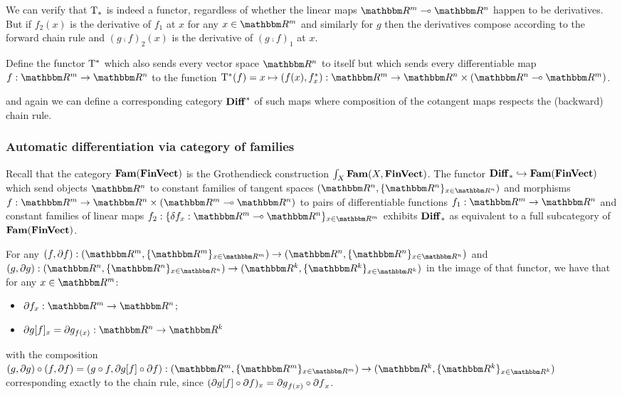 We can verify that $\mathrm{T}_*$ is indeed a functor, regardless of whether the linear maps $\RR^m \linearto
\RR^n$ happen to be derivatives. But if $f_2(x)$ is the derivative of $f_1$ at $x$ for any $x \in \RR^m$ and
similarly for $g$ then the derivatives compose according to the forward chain rule and $(g \comp f)_2(x)$ is
the derivative of $(g \comp f)_1$ at $x$.

\begin{definition}
Define the functor $\mathrm{T}^*$ which also sends every vector space $\RR^n$ to itself but which sends every
differentiable map $f: \RR^m \to \RR^n$ to the function $\tangents^*(f) = x \mapsto (f(x), \pullf{f}_x): \RR^m
\to \RR^n \times (\RR^n \linearto \RR^m)$.
\end{definition}

\noindent and again we can define a corresponding category $\mathbf{Diff}^*$ of such maps where composition of the
cotangent maps respects the (backward) chain rule.

\subsubsection{Automatic differentiation via category of families}

Recall that the category $\mathbf{Fam}(\mathbf{FinVect})$ is the Grothendieck construction $\int_{X}\mathbf{Fam}(X,
\mathbf{FinVect})$. The functor $\mathbf{Diff}_* \hookrightarrow \mathbf{Fam}(\mathbf{FinVect})$ which send objects $\RR^n$ to constant
families of tangent spaces $(\RR^n, \{\RR^n\}_{x \in \RR^n})$ and morphisms $f: \RR^m \to \RR^n \times (\RR^m
\linearto \RR^n)$ to pairs of differentiable functions $f_1: \RR^m \to \RR^n$ and constant families of linear
maps $f_2: \{\delta f_x: \RR^m \linearto \RR^n\}_{x \in \RR^m}$ exhibits $\mathbf{Diff}_*$ as equivalent to a full
subcategory of $\mathbf{Fam}(\mathbf{FinVect})$.

For any $(f, \partial f): (\RR^m, \{\RR^m\}_{x \in \RR^m}) \to (\RR^n, \{\RR^n\}_{x \in \RR^n})$ and $(g,
\partial g): (\RR^n, \{\RR^n\}_{x \in \RR^n}) \to (\RR^k, \{\RR^k\}_{x \in \RR^k})$ in the image of that
functor, we have that for any $x \in \RR^m$:
\begin{itemize}
\item $\partial f_x: \RR^m \to \RR^n$;
\item $\reindex{\partial g}{f}_x = \partial g_{f(x)}: \RR^n \to \RR^k$
\end{itemize}

\noindent with the composition $(g, \partial g) \comp (f, \partial f) = (g \comp f, \reindex{\partial g}{f}
\comp \partial f): (\RR^m, \{\RR^m\}_{x \in \RR^m}) \to (\RR^k, \{\RR^k\}_{x \in \RR^k})$ corresponding
exactly to the chain rule, since $(\partial g[f] \circ \partial f)_x = {\partial g}_{f(x)} \circ
{\partial f}_x$.

